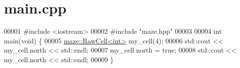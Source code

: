 \hypertarget{main_8cpp_source}{}\section{main.\+cpp}

\begin{DoxyCode}
00001 \textcolor{preprocessor}{#include <iostream>}
00002 \textcolor{preprocessor}{#include "maze.hpp"}
00003 
00004 \textcolor{keywordtype}{int} main(\textcolor{keywordtype}{void}) \{
00005     \hyperlink{classmaze_1_1RawCell}{maze::RawCell<int>} my\_cell(4);
00006     std::cout << my\_cell.north << std::endl;
00007     my\_cell.north = \textcolor{keyword}{true};
00008     std::cout << my\_cell.north << std::endl;
00009 \}
\end{DoxyCode}
